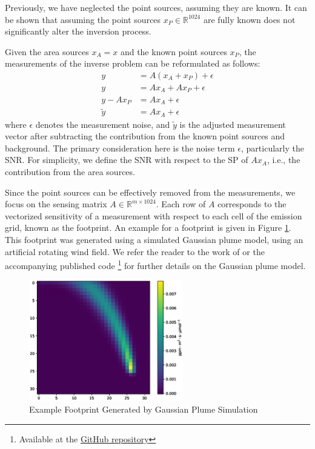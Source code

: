 Previously, we have neglected the point sources, assuming they are known.
It can be shown that assuming the point sources $x_P \in \mathbb{R}^{1024}$ are fully known does not significantly alter the inversion process.

Given the area sources $x_A = x$ and the known point sources $x_P$, the measurements of the inverse problem can be reformulated as follows:
\begin{align}
    y &= A (x_A + x_P) + \epsilon \\
    y &= A x_A + A x_P + \epsilon \\
    y - A x_P &= A x_A + \epsilon \\
    \tilde{y} &= A x_A + \epsilon
\end{align}
where $\epsilon$ denotes the measurement noise, and $\tilde{y}$ is the adjusted measurement vector after subtracting the contribution from the known point sources and background.
The primary consideration here is the noise term $\epsilon$, particularly the \gls{SNR}.
For simplicity, we define the \gls{SNR} with respect to the \gls{SP} of $A x_A$, i.e., the contribution from the area sources.

Since the point sources can be effectively removed from the measurements, we focus on the sensing matrix $A \in \mathbb{R}^{m \times 1024}$.
Each row of $A$ corresponds to the vectorized sensitivity of a measurement with respect to each cell of the emission grid, known as the footprint.
An example for a footprint is given in Figure \ref{fig:footprint}.
This footprint was generated using a simulated Gaussian plume model, using an artificial rotating wind field.
We refer the reader to the work of \textcite{UrbanSparseReconstruction} or the accompanying published code \mbox{}\footnote{Available at the \href{https://github.com/tum-esm/inventory-embeddings/blob/main/src/inverse_problems/footprints/gaussian_plume_model.py}{GitHub repository}} for further details on the Gaussian plume model.
\begin{figure}[htb]
    \centering
    \includegraphics[width=0.6\textwidth]{figures/05_reconstruction/gaussian_plume_footprint.eps}
    \caption{Example Footprint Generated by Gaussian Plume Simulation}
    \label{fig:footprint}
\end{figure}

